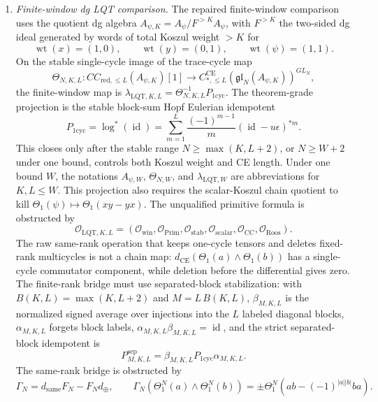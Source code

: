 \begin{enumerate}
  \item \emph{Finite-window dg LQT comparison.}
  The repaired finite-window comparison uses the quotient dg algebra
  \(A_{\psi,K}=A_\psi/F^{>K}A_\psi\), with \(F^{>K}\) the two-sided
  dg ideal generated by words of total Koszul weight \(>K\) for
  \[
    \operatorname{wt}(x)=(1,0),\qquad
    \operatorname{wt}(y)=(0,1),\qquad
    \operatorname{wt}(\psi)=(1,1).
  \]
  On the stable single-cycle image of the trace-cycle map
  \[
    \Theta_{N,K,L}\colon CC_{\mathrm{red},\le L}(A_{\psi,K})[1]
    \to
    C_{*,\le L}^{\mathrm{CE}}(\mathfrak{gl}_N(A_{\psi,K}))^{GL_N},
  \]
  the finite-window map is
  \(\lambda_{\mathrm{LQT},K,L}
  =\Theta_{N,K,L}^{-1}P_{1\mathrm{cyc}}\).
  The theorem-grade projection is the stable block-sum Hopf Eulerian
  idempotent
  \[
    P_{1\mathrm{cyc}}
    =
    \log^*(\operatorname{id})
    =
    \sum_{m=1}^{L}\frac{(-1)^{m-1}}{m}
    (\operatorname{id}-u\epsilon)^{*m}.
  \]
  This closes only after the stable range
  \(N\geq\max(K,L+2)\), or \(N\geq W+2\) under one bound, controls both
  Koszul weight and CE length.  Under one bound \(W\), the notations
  \(A_{\psi,W}\), \(\Theta_{N,W}\), and \(\lambda_{\mathrm{LQT},W}\) are
  abbreviations for \(K,L\le W\).  This projection also requires the
  scalar-Koszul chain quotient to kill
  \(\Theta_1(\psi)\mapsto\Theta_1(xy-yx)\).  The unqualified primitive
  formula is obstructed by
  \[
    \mathcal O_{\mathrm{LQT},K,L}
    =
    (\mathcal O_{\mathrm{win}},
     \mathcal O_{\mathrm{Prim}},
     \mathcal O_{\mathrm{stab}},
     \mathcal O_{\mathrm{scalar}},
     \mathcal O_{\mathrm{CC}},
     \mathcal O_{\mathrm{Roos}}).
  \]
  The raw same-rank operation that keeps one-cycle tensors and deletes
  fixed-rank multicycles is not a chain map:
  \(d_{\mathrm{CE}}(\Theta_1(a)\wedge\Theta_1(b))\) has a single-cycle
  commutator component, while deletion before the differential gives
  zero.  The finite-rank bridge must use separated-block stabilization:
  with \(B(K,L)=\max(K,L+2)\) and \(M=L\,B(K,L)\),
  \(\beta_{M,K,L}\) is the normalized signed average over injections into
  the \(L\) labeled diagonal blocks, \(\alpha_{M,K,L}\) forgets block
  labels, \(\alpha_{M,K,L}\beta_{M,K,L}=\operatorname{id}\), and the
  strict separated-block idempotent is
  \[
    P^{\mathrm{sep}}_{M,K,L}
    =
    \beta_{M,K,L}P_{1\mathrm{cyc}}\alpha_{M,K,L}.
  \]
  The same-rank bridge is obstructed by
  \[
    \Gamma_N=d_{\mathrm{same}}F_N-F_Nd_{\oplus},
    \qquad
    \Gamma_N(\Theta_1^N(a)\wedge\Theta_1^N(b))
    =
    \pm\Theta_1^N(ab-(-1)^{|a||b|}ba).
  \]


\end{enumerate}
